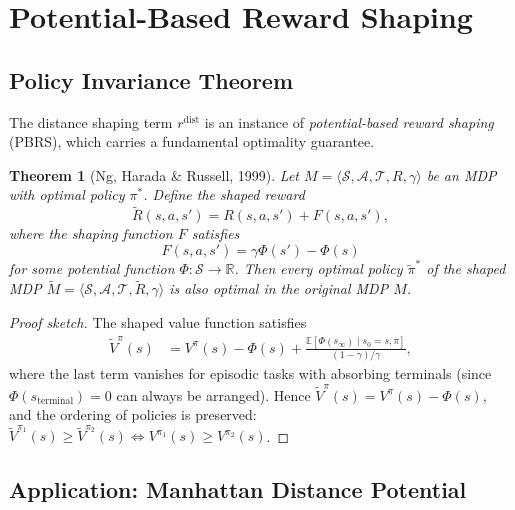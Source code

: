 \documentclass[11pt,a4paper]{article}
\newtheorem{theorem}{Theorem}[section]
\newcommand{\R}{\mathbb{R}}
\newcommand{\E}{\mathbb{E}}
\newcommand{\cS}{\mathcal{S}}
\newcommand{\cA}{\mathcal{A}}
\newcommand{\cT}{\mathcal{T}}
\newcommand{\policy}{\pi}
\begin{document}
\section{Potential-Based Reward Shaping}

\subsection{Policy Invariance Theorem}

The distance shaping term $r^{\text{dist}}$ is an instance of
\emph{potential-based reward shaping} (PBRS), which carries a fundamental optimality guarantee.

\begin{theorem}[Ng, Harada \& Russell, 1999]
\label{thm:pbrs}
Let $M = \langle \cS, \cA, \cT, R, \gamma \rangle$ be an MDP with optimal policy $\policy^*$.
Define the shaped reward
\begin{equation}
  \tilde{R}(s, a, s') = R(s, a, s') + F(s, a, s'),
\end{equation}
where the shaping function $F$ satisfies
\begin{equation}
  F(s, a, s') = \gamma \Phi(s') - \Phi(s)
  \label{eq:pbrs}
\end{equation}
for some \emph{potential function} $\Phi : \cS \to \R$.
Then every optimal policy $\tilde{\policy}^*$ of the shaped MDP
$\tilde{M} = \langle \cS, \cA, \cT, \tilde{R}, \gamma \rangle$
is also optimal in the original MDP $M$.
\end{theorem}

\begin{proof}[Proof sketch]
The shaped value function satisfies
\begin{align}
  \tilde{V}^{\policy}(s)
    &= V^{\policy}(s) - \Phi(s) + \frac{\E[\Phi(s_\infty) \mid s_0=s,\policy]}{(1-\gamma)/\gamma},
\end{align}
where the last term vanishes for episodic tasks with absorbing terminals
(since $\Phi(s_{\text{terminal}}) = 0$ can always be arranged).
Hence $\tilde{V}^{\policy}(s) = V^{\policy}(s) - \Phi(s)$,
and the ordering of policies is preserved:
$\tilde{V}^{\policy_1}(s) \ge \tilde{V}^{\policy_2}(s) \iff V^{\policy_1}(s) \ge V^{\policy_2}(s)$.
\end{proof}

\subsection{Application: Manhattan Distance Potential}
\end{document}
